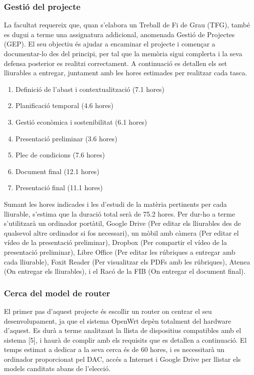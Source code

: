 \documentclass[11pt]{article}
\begin{document}
\subsubsection{Gestió del projecte}
La facultat requereix que, quan s’elabora un Treball de Fi de Grau (TFG), també es dugui a terme una assignatura addicional,  anomenada Gestió de Projectes (GEP). El seu objectiu és ajudar a encaminar el projecte i començar a documentar-lo des del principi, per tal que la memòria sigui complerta i la seva defensa posterior es realitzi correctament. A continuació es detallen els set lliurables a entregar, juntament amb les hores estimades per realitzar cada tasca.
\begin{enumerate}
\item Definició de l’abast i contextualització (7.1 hores)
\item Planificació temporal (4.6 hores)
\item Gestió econòmica i sostenibilitat (6.1 hores)
\item Presentació preliminar (3.6 hores)
\item Plec de condicions (7.6 hores)
\item Document final (12.1 hores)
\item Presentació final (11.1 hores)
\end{enumerate}
Sumant les hores indicades i les d’estudi de la matèria pertinents per cada lliurable, s’estima que la duració total serà de 75.2 hores.
Per dur-ho a terme s’utilitzarà un ordinador portàtil, Google Drive (Per editar els lliurables des de qualsevol altre ordinador si fos necessari), un mòbil amb càmera (Per editar el vídeo de la presentació preliminar), Dropbox (Per compartir el vídeo de la presentació preliminar), Libre Office (Per editar les rúbriques a entregar amb cada lliurable), Foxit Reader (Per visualitzar els PDFs amb les rúbriques), Atenea (On entregar els lliurables), i el Racó de la FIB (On entregar el document final).
\subsubsection{Cerca del model de router}
El primer pas d’aquest projecte és escollir un router on centrar el seu desenvolupament, ja que el sistema OpenWrt depèn totalment del hardware d’aquest. Es durà a terme analitzant la llista de dispositius compatibles amb el sistema [5], i haurà de complir amb els requisits que es detallen a continuació. El temps estimat a dedicar a la seva cerca és de 60 hores, i es necessitarà un ordinador proporcionat pel DAC, accés a Internet i Google Drive per llistar els models canditats abans de l’elecció.
\end{document}
